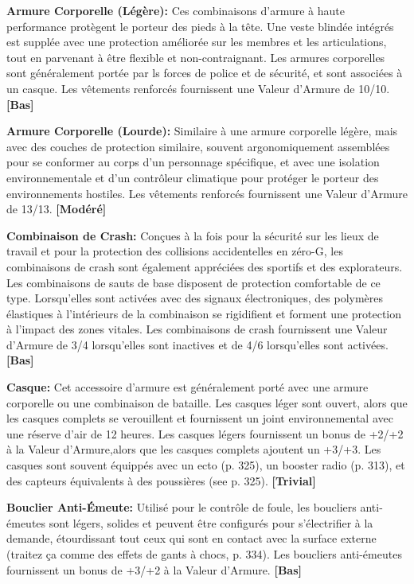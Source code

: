 {{\textbf{Armure Corporelle (Légère):} Ces combinaisons d'armure à haute performance protègent le porteur des pieds à la tête. Une veste blindée intégrés est supplée avec une protection améliorée sur les membres et les articulations, tout en parvenant à être flexible et non-contraignant. Les armures corporelles sont généralement portée par ls forces de police et de sécurité, et sont associées à un casque. Les vêtements renforcés fournissent une Valeur d'Armure de 10/10. \textbf{[Bas]} 

\textbf{Armure Corporelle (Lourde):} Similaire à une armure corporelle légère, mais avec des couches de protection similaire, souvent argonomiquement assemblées pour se conformer au corps d'un personnage spécifique, et avec une isolation environnementale et d'un contrôleur climatique pour protéger le porteur des environnements hostiles. Les vêtements renforcés fournissent une Valeur d'Armure de 13/13. \textbf{[Modéré]} 

\textbf{Combinaison de Crash:} Conçues à la fois pour la sécurité sur les lieux de travail et pour la protection des collisions accidentelles en zéro-G, les combinaisons de crash sont également appréciées des sportifs et des explorateurs. Les combinaisons de sauts de base disposent de protection comfortable de ce type. Lorsqu'elles sont activées avec des signaux électroniques, des polymères élastiques à l'intérieurs de la combinaison se rigidifient et forment une protection à l'impact des zones vitales. Les combinaisons de crash fournissent une Valeur d'Armure de 3/4 lorsqu'elles sont inactives et de 4/6 lorsqu'elles sont activées. \textbf{[Bas]} 

\textbf{Casque:} Cet accessoire d'armure est généralement porté avec une armure corporelle ou une combinaison de bataille. Les casques léger sont ouvert, alors que les casques complets se verouillent et fournissent un joint environnemental avec une réserve d'air de 12 heures. Les casques légers fournissent un bonus de +2/+2 à la  Valeur d'Armure,alors que les casques complets ajoutent un +3/+3. Les casques sont souvent équippés avec un ecto (p. 325), un booster  radio (p. 313), et des capteurs équivalents à des poussières (see p. 325). \textbf{[Trivial]} 

\textbf{Bouclier Anti-Émeute:} Utilisé pour le contrôle de foule, les boucliers anti-émeutes sont légers, solides et peuvent être configurés pour s'électrifier à la demande, étourdissant tout ceux qui sont en contact avec la surface externe (traitez ça comme des effets de gants à chocs, p. 334). Les boucliers anti-émeutes fournissent un bonus de +3/+2 à la Valeur d'Armure. \textbf{[Bas]} 

}}
